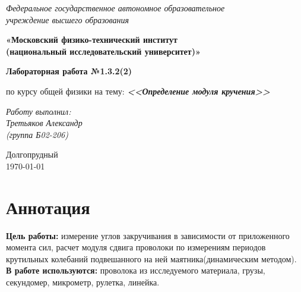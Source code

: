 \documentclass[a4paper,14pt]{extarticle}
\begin{document}
	\begin{center}
		\textit{Федеральное государственное автономное образовательное\\ учреждение высшего образования }
		
		\vspace{0.5ex}
		
		\textbf{«Московский физико-технический институт\\ (национальный исследовательский университет)»}
	\end{center}
	
	\vspace{10ex}
	

	\begin{center}
		\vspace{13ex}	
		\textbf{Лабораторная работа №1.3.2(2)}	
		\vspace{1ex}
	
		по курсу общей физики		
		на тему:		
		\textbf{\textit{<<Определение модуля кручения>>}}		
		\vspace{30ex}

	\begin{flushright}
		\noindent
		\textit{Работу выполнил:}\\  
		\textit{Третьяков Александр \\(группа Б02-206)}
	\end{flushright}
	\vfill
	Долгопрудный \\ \today

\end{center}
\newpage
	\section{Аннотация}
	\textbf{Цель работы:} измерение углов закручивания в зависимости от приложенного момента сил, расчет модуля сдвига проволоки по измерениям периодов крутильных колебаний подвешанного на ней 	маятника(динамическим методом).\\
	\textbf{В работе используются:} проволока из исследуемого материала, грузы, секундомер, микрометр, рулетка, линейка.
\end{document}
